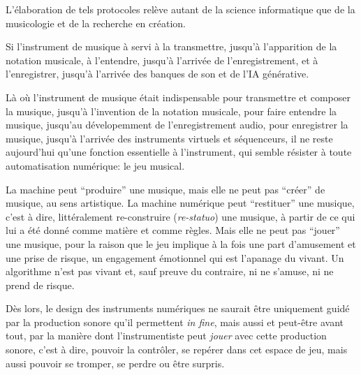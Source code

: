 L'élaboration de tels protocoles relève autant de la science informatique que de la musicologie et de la recherche en création.


Si l'instrument de musique à servi à la transmettre, jusqu'à l'apparition de la notation musicale, à l'entendre, jusqu'à l'arrivée de l'enregistrement, et à l'enregistrer, jusqu'à l'arrivée des banques de son et de l'IA générative.


Là où l'instrument de musique était indispensable pour transmettre et composer la musique, jusqu'à l'invention de la notation musicale, pour faire entendre la musique, jusqu'au dévelopemment de l'enregistrement audio, pour enregistrer la musique, jusqu'à l'arrivée des instruments virtuels et séquenceurs, il ne reste aujourd'hui qu'une fonction essentielle à l'instrument, qui semble résister à toute automatisation numérique: le jeu musical.

La machine peut ``produire'' une musique, mais elle ne peut pas ``créer'' de musique, au sens artistique.
La machine numérique peut ``restituer'' une musique, c'est à dire, littéralement re-construire (\textit{re-statuo}) une musique, à partir de ce qui lui a été donné comme matière et comme règles.
Mais elle ne peut pas ``jouer'' une musique, pour la raison que le jeu implique à la fois une part d'amusement et une prise de risque, un engagement émotionnel qui est l'apanage du vivant. Un algorithme n'est pas vivant et, sauf preuve du contraire, ni ne s'amuse, ni ne prend de risque.

Dès lors, le design des instruments numériques ne saurait être uniquement guidé par la production sonore qu'il permettent \textit{in fine}, mais aussi et peut-être avant tout, par la manière dont l'instrumentiste peut \textit{jouer} avec cette production sonore, c'est à dire, pouvoir la contrôler, se repérer dans cet espace de jeu, mais aussi pouvoir se tromper, se perdre ou être surpris.




